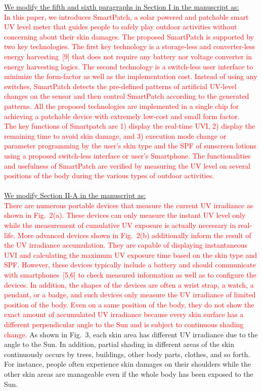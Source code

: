 \documentclass[onecolumn]{IEEEconf}
\begin{document}
\begin{description}
\underline{We modify the fifth and sixth paragraphs in Section I in the manuscript as:}\\
\textcolor{red}{In this paper, we introduces SmartPatch, a solar powered  and patchable smart UV level meter that guides people to safely play outdoor activities without concerning about their skin damages. The proposed SmartPatch is supported by two key technologies. The first key technology is a storage-less and converter-less energy harvesting~[9] that does not require any battery nor voltage converter in energy harvesting logics. The second technology is a switch-less user interface to minimize the form-factor as well as the implementation cost. Instead of using any switches, SmartPatch detects the pre-defined patterns of artificial UV-level changes on the sensor and then control SmartPatch according to the generated patterns. All the proposed technologies are implemented in a single chip for achieving a patchable device with extremely low-cost and small form factor.\\
% 
The key functions of Smartpatch are 1) display the real-time UVI, 2) display the remaining time to avoid skin damage, and 3) execution mode change or parameter programming by the user's skin type and the SPF of sunscreen lotions using a proposed switch-less interface or user's Smartphone. The functionalities and usefulness of SmartPatch are verified by measuring the UV level on several positions of the body during the various types of outdoor activities.}\\
~\\

\underline{We modify Section II-A in the manuscript as:}\\
\textcolor{red}{There are numerous portable devices that measure the current UV irradiance as shown in Fig.~2(a).
These devices can only measure the instant UV level only while the measurement of cumulative UV exposure is actually necessary in real-life. More advanced devices shown in Fig.~2(b) additionally inform the result of the UV irradiance accumulation. They are capable of displaying instantaneous UVI and calculating the maximum UV exposure time based on the skin type and SPF.
However, these devices typically include a battery and should communicate with smartphones~[5,6] to check measured information as well as to configure the devices. In addition, the shapes of the devices are often a wrist strap, a watch, a pendant, or a badge, and such devices only measure the UV irradiance of limited position of the body. Even on a same position of the body, they do not show the exact amount of accumulated UV irradiance because every skin surface has a different perpendicular angle to the Sun and is subject to continuous shading change.}
%
As shown in Fig.~3, each skin area has different UV irradiance due to the angle to the Sun.
In addition, partial shading in different areas of the skin continuously occurs by trees, buildings, other body parts, clothes, and so forth. For instance, people often experience skin damages on their shoulders while the other skin areas are manageable even if the whole body has been exposed to the Sun.\\
~\\


\end{description}
\end{document}

